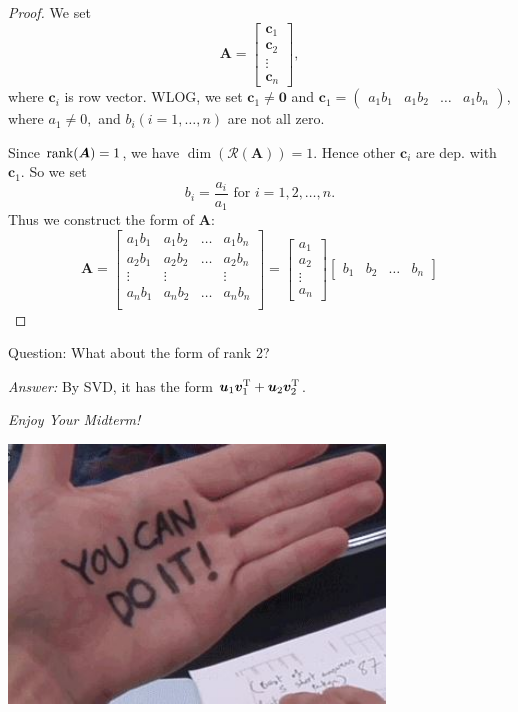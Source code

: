 \begin{proof}
We set 
\[
\bm A = \begin{bmatrix}
\bm c_1\\\bm c_2\\\vdots\\\bm c_n
\end{bmatrix},
\] 
where $\bm c_i$ is row vector. WLOG, we set $\bm c_1\ne\bm 0$ and $\bm c_1 = \begin{pmatrix}
a_1b_1&a_1b_2&\dots&a_1b_n
\end{pmatrix}$, where $a_1\ne0,$ and $b_i(i=1,\dots,n)$ are not all zero.

Since $\operatorname{rank}(\bm A) = 1$, we have $\dim(\mathcal{R}(\bm A)) = 1$. Hence other $\bm c_i$ are dep. with $\bm c_1$. So we set 
\[
b_i = \frac{a_i}{a_1}\mbox{ for }i=1,2,\dots,n.
\]
Thus we construct the form of $\bm A$:
\[
\bm A = \begin{bmatrix}
a_1b_1&a_1b_2&\dots&a_1b_n\\
a_2b_1&a_2b_2&\dots&a_2b_n\\
\vdots&\vdots&&\vdots\\
a_nb_1&a_nb_2&\dots&a_nb_n\\
\end{bmatrix} = \begin{bmatrix}
a_1\\a_2\\\vdots\\a_n
\end{bmatrix}\begin{bmatrix}
b_1&b_2&\dots&b_n
\end{bmatrix}
\]
\end{proof}
Question: What about the form of rank 2?

\textit{Answer: }By SVD, it has the form $\bm u_1\bm v_1^{\mathrm T}+\bm u_2\bm v_2^{\mathrm T}$.

\textit{Enjoy Your Midterm!}

\includegraphics[width =10cm]{do_it}




















